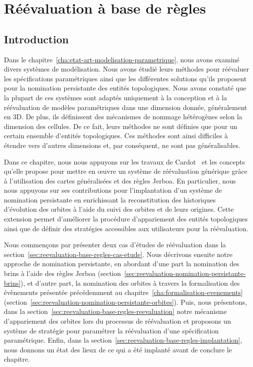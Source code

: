 \chapter{Réévaluation à base de règles}
\label{cha:reevaluation-base-regles}



\section{Introduction}
\label{sec:reevaluation-base-regles-introduction}



Dans le chapitre~\ref{cha:etat-art-modelisation-parametrique}, nous avons examiné divers systèmes de modélisation. Nous avons étudié leurs méthodes pour réévaluer les spécifications paramétriques ainsi que les différentes solutions qu'ils proposent pour la nomination persistante des entités topologiques. %
Nous avons constaté que la plupart de ces systèmes sont adaptés uniquement à la conception et à la réévaluation de modèles paramétriques dans une dimension donnée, généralement en 3D. De plus, ils définissent des mécanismes de nommage hétérogènes selon la dimension des cellules.%
De ce fait, leurs méthodes ne sont définies que pour un certain ensemble d'entités topologiques. Ces méthodes sont ainsi difficiles à étendre vers d'autres dimensions et, par conséquent, ne sont pas généralisables. %



Dans ce chapitre, nous nous appuyons sur les travaux de Cardot~\cite{cardot2019}
et les concepts qu'elle propose pour mettre en \oe uvre un système de
réévaluation générique grâce à l'utilisation des cartes généralisées et des
règles Jerboa. %
En particulier, nous nous appuyons sur ses contributions pour l'implantation d'un système de
nomination persistante en enrichissant la reconstitution des historiques d'évolution des
orbites à l'aide du suivi des orbites et de leurs origines. %
Cette extension permet d'améliorer la procédure
d'appariement des entités topologiques ainsi que de définir des stratégies
accessibles aux utilisateurs pour la réévaluation. %

Nous commençons par présenter deux cas d'études de réévaluation dans la section~\ref{sec:reevaluation-base-regles-cas-etude}.
Nous décrivons ensuite notre approche de nomination persistante, en abordant d'une part la nomination des brins à l'aide des règles Jerboa (section~\ref{sec:reevaluation-nomination-persistante-brins}), et d'autre part, la nomination des orbites à travers la formalisation des évènements présentée précédemment au  chapitre~\ref{cha:formalisation-evenements} (section~\ref{sec:reevaluation-nomination-persistante-orbites}). Puis, nous présentons, dans la section~\ref{sec:reevaluation-base-regles-reevaluation} notre mécanisme d'appariement des
orbites lors du processus de réévaluation et proposons un système de stratégie pour paramétrer la réévaluation d'une spécification paramétrique. %
Enfin, dans la section~\ref{sec:reevaluation-base-regles-implantation}, nous donnons un état des lieux de ce qui a été
implanté avant de conclure le chapitre. %


